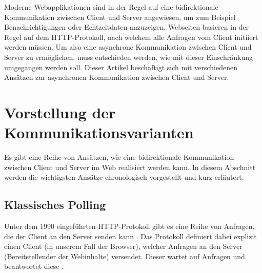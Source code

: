 \documentclass[sigplan, screen]{acmart}
\begin{document}
Moderne Webapplikationen sind in der Regel auf eine bidirektionale Kommunikation zwischen Client und Server angewiesen,
um zum Beispiel Benachrichtigungen oder Echtzeitdaten anzuzeigen.
Webseiten basieren in der Regel auf dem HTTP-Protokoll, nach welchem alle Anfragen vom Client initiiert werden müssen.
Um also eine asynchrone Kommunikation zwischen Client und Server zu ermöglichen, muss entschieden werden, wie mit dieser Einschränkung umgegangen werden soll.
Dieser Artikel beschäftigt sich mit verschiedenen Ansätzen zur asynchronen Kommunikation zwischen Client und Server.



\section{Vorstellung der Kommunikationsvarianten}

Es gibt eine Reihe von Ansätzen, wie eine bidirektionale Kommunikation zwischen Client und Server im Web realisiert werden kann.
In diesem Abschnitt werden die wichtigsten Ansätze chronologisch vorgestellt und kurz erläutert.

\subsection{Klassisches Polling}

Unter dem 1990 eingeführten \cite[Abs. 1.2]{fielding_http_2022} HTTP-Protokoll gibt es eine Reihe von Anfragen, die der Client an den Server senden kann \cite{noauthor_http_nodate}.
Das Protokoll definiert dabei explizit einen Client (in unserem Fall der Browser), welcher Anfragen an den Server (Bereitstellender der Webinhalte) versendet.
Dieser wartet auf Anfragen und beantwortet diese \cite[Abs. 1.3]{fielding_http_2022}.
\end{document}

